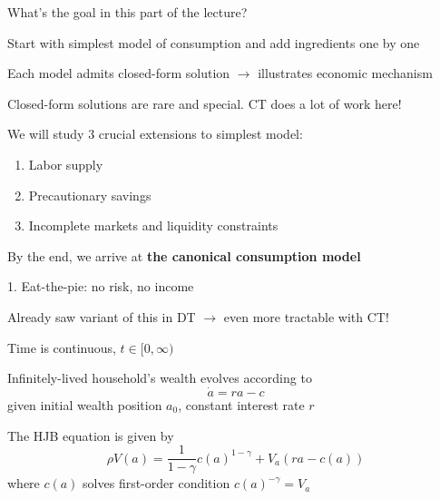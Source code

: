 \documentclass[11pt, aspectratio=169]{beamer}
\newenvironment{witemize}{\itemize\addtolength{\itemsep}{10pt}}{\enditemize}
\begin{document}
\begin{frame}{What's the goal in this part of the lecture?}
\begin{witemize}
\item Start with simplest model of consumption and add ingredients one by one

\item Each model admits closed-form solution $\to$ illustrates economic mechanism

	{\footnotesize Closed-form solutions are rare and special. CT does a lot of work here!}

\item We will study 3 crucial extensions to simplest model:
\begin{enumerate}
	\item Labor supply
	\item Precautionary savings
	\item Incomplete markets and liquidity constraints
\end{enumerate}

\item By the end, we arrive at \textbf{the canonical consumption model}
\end{witemize}
\end{frame}


\begin{frame}{1. Eat-the-pie: no risk, no income}
\begin{witemize}
\item Already saw variant of this in DT $\to$ even more tractable with CT! 

\item Time is continuous, $t \in [0, \infty)$

\item Infinitely-lived household's wealth evolves according to 
\begin{equation*}
	\dot a = ra - c
\end{equation*}
given initial wealth position $a_0$, constant interest rate $r$

\item The HJB equation is given by
\begin{equation*}
	\rho V(a) = \frac{1}{1-\gamma} c(a)^{1-\gamma} + V_a (r a - c(a))
\end{equation*}
where $c(a)$ solves first-order condition $c(a)^{-\gamma} = V_a$
\end{witemize}
\end{frame}
\end{document}
